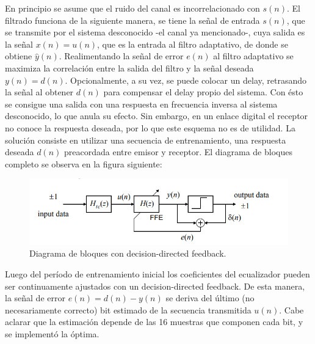 En principio se asume que el ruido del canal 
es incorrelacionado con $s(n)$.
El filtrado funciona de la siguiente manera, se tiene 
la señal de entrada $s(n)$, que se transmite por el sistema
desconocido -el canal ya mencionado-, cuya salida es la señal 
$x(n)=u(n)$, que es la entrada al filtro adaptativo, de donde se obtiene
$\hat{y}(n)$. Realimentando la señal de error $e(n)$
al filtro adaptativo se maximiza la correlación entre la salida del 
filtro y la señal deseada $y(n)=d(n)$.
Opcionalmente, a su vez, se puede colocar un delay, retrasando la señal al obtener 
$d(n)$ para compensar el delay propio del sistema.\newline
Con ésto se consigue una salida con una respuesta en frecuencia inversa
al sistema desconocido, lo que anula su efecto.\newline
Sin embargo, en un enlace digital el receptor no conoce la respuesta deseada, por lo que
este esquema no es de utilidad. La solución consiste en utilizar 
una secuencia de entrenamiento, una respuesta deseada $d(n)$ preacordada entre 
emisor y receptor.
El diagrama de bloques completo se observa en la figura siguiente:
\begin{figure}[h]
    \centering
    \includegraphics[scale=0.4]{imagenes/esquema.PNG}
    \caption{Diagrama de bloques con decision-directed feedback.}
\end{figure}
Luego del período de entrenamiento inicial los coeficientes del ecualizador pueden ser
 continuamente ajustados con un decision-directed feedback. De esta manera, 
 la señal de error $e(n)=d(n)-y(n)$ se deriva del último (no necesariamente correcto) 
 bit estimado de la secuencia transmitida $u(n)$. Cabe aclarar que 
 la estimación depende de las 16 muestras que componen cada bit, y se implementó la óptima.
